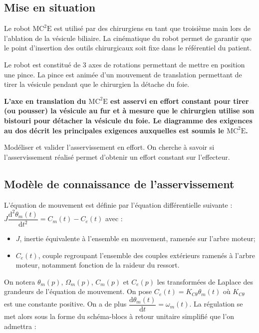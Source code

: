 \ifprof
\else
\begin{multicols}{2}
\fi
\section*{Mise en situation}
\ifprof
\else
Le robot $\text{MC}^2\text{E}$ est utilisé par des chirurgiens en tant que troisième main lors de l'ablation de la vésicule biliaire. La cinématique du robot permet de garantir que le point d'insertion des outils chirurgicaux soit fixe dans le référentiel du patient. 

Le robot est constitué de 3 axes de rotations permettant de mettre en position une pince. La pince est animée d'un mouvement de translation permettant de tirer la vésicule pendant que le chirurgien la détache du foie. 

\textbf{L’axe en translation du $\text{MC}^2\text{E}$ est asservi en effort constant pour tirer (ou pousser) la vésicule au fur et à mesure que le chirurgien utilise son bistouri pour détacher la vésicule du foie. Le diagramme des exigences au dos décrit les principales exigences auxquelles est soumis le $\text{MC}^2\text{E}$.}


\begin{obj}
Modéliser et valider l’asservissement en effort. On cherche à savoir si l'asservissement réalisé permet d'obtenir un effort constant sur l'effecteur. 
\end{obj}

\fi


\subsection*{Modèle de connaissance de l'asservissement}
\ifprof
\else
L’équation de mouvement est définie par l’équation différentielle suivante : 
$J\dfrac{\text{d}^2\theta_m(t)}{\text{d}t^2}=C_m(t)-C_e(t)$  avec :
\begin{itemize}
\item $J$, inertie équivalente à l’ensemble en mouvement, ramenée sur l’arbre moteur;
\item $C_e(t)$, couple regroupant l’ensemble des couples extérieurs ramenés à l’arbre moteur, notamment fonction de la raideur du ressort.
\end{itemize}


On notera $\theta_m(p)$, $\Omega_m(p)$, $C_m(p)$ et $C_e(p)$ les transformées de Laplace des grandeurs de l’équation de mouvement.
On pose $C_e(t)=K_{C\theta}\theta_m(t)$ où  $K_{C\theta}$ est une constante positive. On a de plus $\dfrac{\text{d}\theta_m(t)}{\text{d}t}=\omega_m(t)$. La régulation se met alors sous la forme du schéma-blocs à retour unitaire simplifié que l’on
admettra :


\end{multicols}
